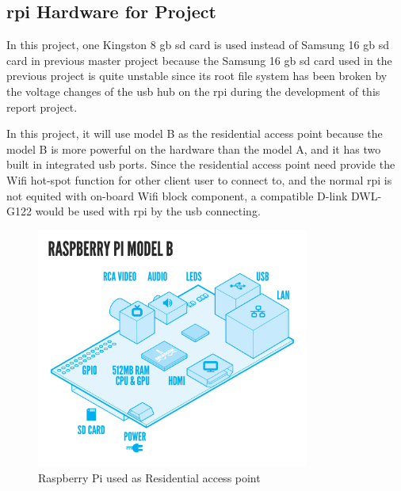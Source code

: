 \subsection{\gls{rpi} Hardware for Project}
\par In this project, one Kingston 8 \gls{gb} \gls{sd} card is used instead of Samsung 16 \gls{gb} \gls{sd} card in previous master project\cite{TorgeirMR} because the Samsung 16 \gls{gb} \gls{sd} card used in the previous project is quite unstable since its root file system has been broken by the voltage changes of the \gls{usb} hub on the \gls{rpi} during the development of this report project. 
\par In this project, it will use model B as the residential access point because the model B is more powerful on the hardware than the model A, and it has two built in integrated \gls{usb} ports. Since the residential access point need provide the Wifi hot-spot function for other client user to connect to, and the normal \gls{rpi} is not equited with on-board Wifi block component, a compatible D-link DWL-G122 would be used with \gls{rpi} by the \gls{usb} connecting.
\begin{figure}
	\centering
    	\includegraphics[width=0.80\textwidth,natwidth=610,natheight=642]{figs/RaspiModelB.png}
  	\caption{Raspberry Pi used as Residential access point}
  	\label{fig:rpi}
\end{figure}

